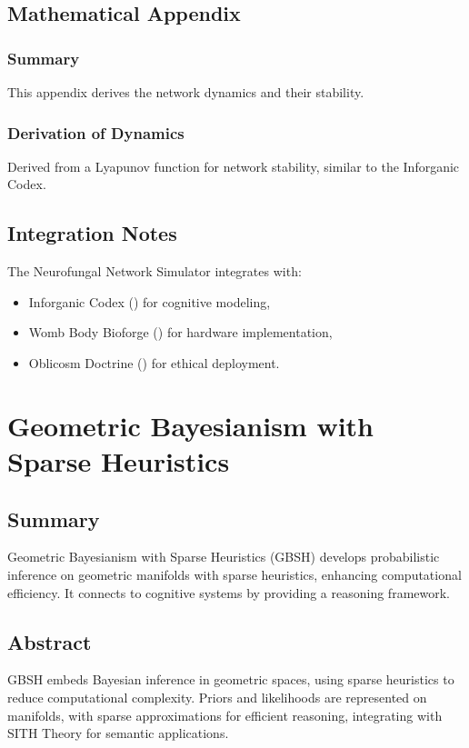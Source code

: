 \documentclass[11pt,oneside]{memoir}
\theoremstyle{plain}
\begin{document}
\section{Mathematical Appendix}
\subsection{Summary}
This appendix derives the network dynamics and their stability.

\subsection{Derivation of Dynamics}
Derived from a Lyapunov function for network stability, similar to the Inforganic Codex.

\section{Integration Notes}
The Neurofungal Network Simulator integrates with:
\begin{itemize}
    \item Inforganic Codex () for cognitive modeling,
    \item Womb Body Bioforge () for hardware implementation,
    \item Oblicosm Doctrine () for ethical deployment.
\end{itemize}

\chapter{Geometric Bayesianism with Sparse Heuristics}
\label{sec:gbsh}

\section{Summary}
Geometric Bayesianism with Sparse Heuristics (GBSH) develops probabilistic inference on geometric manifolds with sparse heuristics, enhancing computational efficiency. It connects to cognitive systems by providing a reasoning framework.

\section{Abstract}
GBSH embeds Bayesian inference in geometric spaces, using sparse heuristics to reduce computational complexity. Priors and likelihoods are represented on manifolds, with sparse approximations for efficient reasoning, integrating with SITH Theory for semantic applications.
\end{document}
